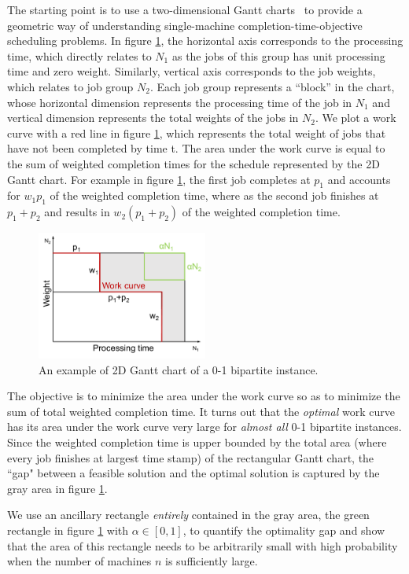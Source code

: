 The starting point is to use a two-dimensional Gantt charts~\cite{eastman1964bounds} to provide a geometric way of understanding single-machine completion-time-objective scheduling problems. In figure \ref{fig:gantt}, the horizontal axis corresponds to the processing time, which directly relates to $N_1$ as the jobs of this group has unit processing time and zero weight. Similarly, vertical axis corresponds to the job weights, which relates to job group $N_2$. Each job group represents a ``block'' in the chart, whose horizontal dimension represents the processing time of the job in $N_1$ and vertical dimension represents the total weights of the jobs in $N_2$. We plot a work curve with a red line in figure \ref{fig:gantt}, which represents the total weight of jobs that have not been completed by time t. The area under the work curve is equal to the sum of weighted completion times for the schedule represented by the 2D Gantt chart. For example in figure \ref{fig:gantt}, the first job completes at $p_1$ and accounts for $w_1p_1$ of the weighted completion time, where as the second job finishes at $p_1 + p_2$ and results in $w_2(p_1+p_2)$ of the weighted completion time. 
\begin{figure}[h]
	\centering
	\includegraphics[width=0.5\textwidth]{figs/gantt.pdf}
	\caption{An example of 2D Gantt chart of a 0-1 bipartite instance.}
	\label{fig:gantt}
\end{figure}

The objective is to minimize the area under the work curve so as to minimize the sum of total weighted completion time. It turns out that the \emph{optimal} work curve has its area under the work curve very large for \emph{almost all} 0-1 bipartite instances. Since the weighted completion time is upper bounded by the total area (where every job finishes at largest time stamp) of the rectangular Gantt chart, the ``gap" between a feasible solution and the optimal solution is captured by the gray area in figure \ref{fig:gantt}.

We use an ancillary rectangle \emph{entirely} contained in the gray area, the green rectangle in figure \ref{fig:gantt} with $\alpha \in [0,1]$, to quantify the optimality gap and show that the area of this rectangle needs to be arbitrarily small with high probability when the number of machines $n$ is sufficiently large. 

